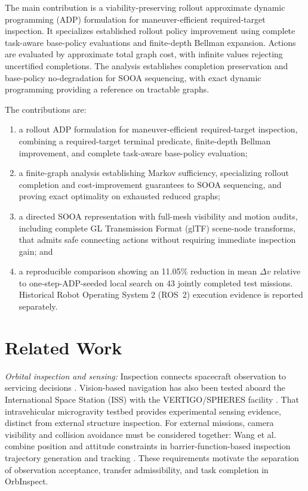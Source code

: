 \documentclass{IEEEtaes}
\theoremstyle{remark}
\theoremstyle{plain}
\begin{document}
The main contribution is a viability-preserving rollout approximate dynamic programming (ADP) formulation for maneuver-efficient required-target inspection. It specializes established rollout policy improvement \cite{bertsekas1997combinatorial,bertsekas2020rollout} using complete task-aware base-policy evaluations and finite-depth Bellman expansion. Actions are evaluated by approximate total graph cost, with infinite values rejecting uncertified completions. The analysis establishes completion preservation and base-policy no-degradation for SOOA sequencing, with exact dynamic programming providing a reference on tractable graphs.

The contributions are:
\begin{enumerate}
  \item a rollout ADP formulation for maneuver-efficient required-target inspection, combining a required-target terminal predicate, finite-depth Bellman improvement, and complete task-aware base-policy evaluation;
  \item a finite-graph analysis establishing Markov sufficiency, specializing rollout completion and cost-improvement guarantees to SOOA sequencing, and proving exact optimality on exhausted reduced graphs;
  \item a directed SOOA representation with full-mesh visibility and motion audits, including complete GL Transmission Format (glTF) scene-node transforms, that admits safe connecting actions without requiring immediate inspection gain; and
  \item a reproducible comparison showing an 11.05\% reduction in mean $\Delta v$ relative to one-step-ADP-seeded local search on 43 jointly completed test missions. Historical Robot Operating System 2 (ROS~2) execution evidence is reported separately.
\end{enumerate}


\section{Related Work}
\label{sec:related}

\emph{Orbital inspection and sensing:} Inspection connects spacecraft observation to servicing decisions \cite{flores2014review,kimura2000inspection}. Vision-based navigation has also been tested aboard the International Space Station (ISS) with the VERTIGO/SPHERES facility \cite{tweddle2016facility}. That intravehicular microgravity testbed provides experimental sensing evidence, distinct from external structure inspection. For external missions, camera visibility and collision avoidance must be considered together: Wang et al. combine position and attitude constraints in barrier-function-based inspection trajectory generation and tracking \cite{wang2024inspection}. These requirements motivate the separation of observation acceptance, transfer admissibility, and task completion in OrbInspect.
\end{document}
